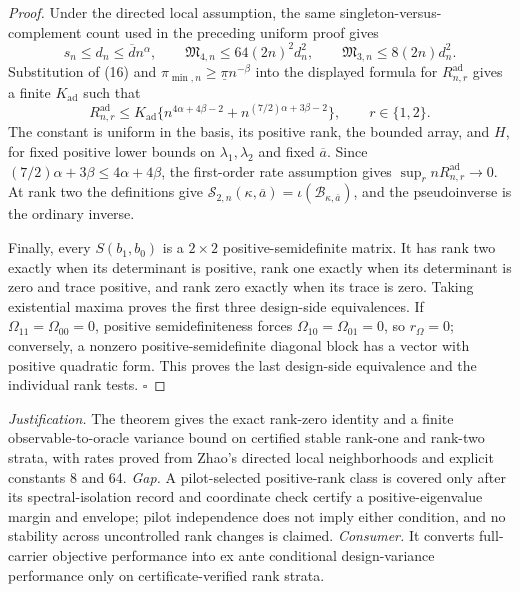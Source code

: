 \documentclass{article}
\begin{document}
\begin{proof}
Under the directed local assumption, the same singleton-versus-complement count used in the preceding uniform proof gives
\[
s_n\le d_n\le\overline d n^\alpha,
\qquad
\mathfrak M_{4,n}\le64(2n)^2d_n^2,
\qquad
\mathfrak M_{3,n}\le8(2n)d_n^2.
\tag{16}
\]
Substitution of (16) and \(\pi_{\min,n}\ge\underline\pi n^{-\beta}\) into the displayed formula for \(R_{n,r}^{\mathrm{ad}}\) gives a finite \(K_{\mathrm{ad}}\) such that
\[
R_{n,r}^{\mathrm{ad}}
\le K_{\mathrm{ad}}\{n^{4\alpha+4\beta-2}
+n^{(7/2)\alpha+3\beta-2}\},
\qquad r\in\{1,2\}.
\tag{17}
\]
The constant is uniform in the basis, its positive rank, the bounded array, and \(H\), for fixed positive lower bounds on \(\lambda_1,\lambda_2\) and fixed \(\overline a\).  Since \((7/2)\alpha+3\beta\le4\alpha+4\beta\), the first-order rate assumption gives \(\sup_r nR_{n,r}^{\mathrm{ad}}\to0\).  At rank two the definitions give \(\mathcal S_{2,n}(\kappa,\overline a)=\iota(\mathcal B_{\kappa,\overline a})\), and the pseudoinverse is the ordinary inverse.

Finally, every \(S(b_1,b_0)\) is a \(2\times2\) positive-semidefinite matrix.  It has rank two exactly when its determinant is positive, rank one exactly when its determinant is zero and trace positive, and rank zero exactly when its trace is zero.  Taking existential maxima proves the first three design-side equivalences.  If \(\Omega_{11}=\Omega_{00}=0\), positive semidefiniteness forces \(\Omega_{10}=\Omega_{01}=0\), so \(r_\Omega=0\); conversely, a nonzero positive-semidefinite diagonal block has a vector with positive quadratic form.  This proves the last design-side equivalence and the individual rank tests. \(\square\)
\end{proof}
\par\smallskip\noindent \textit{Justification.} The theorem gives the exact rank-zero identity and a finite observable-to-oracle variance bound on certified stable rank-one and rank-two strata, with rates proved from Zhao's directed local neighborhoods and explicit constants 8 and 64. \textit{Gap.} A pilot-selected positive-rank class is covered only after its spectral-isolation record and coordinate check certify a positive-eigenvalue margin and envelope; pilot independence does not imply either condition, and no stability across uncontrolled rank changes is claimed. \textit{Consumer.} It converts full-carrier objective performance into ex ante conditional design-variance performance only on certificate-verified rank strata.
\end{document}
